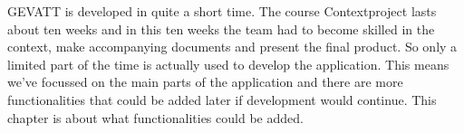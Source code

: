 GEVATT is developed in quite a short time. The course Contextproject lasts about ten weeks and in this ten weeks the team had to become skilled in the context, make accompanying documents	 and present the final product. So only a limited part of the time is actually used to develop the application. This means we've focussed on the main parts of the application and there are more functionalities that could be added later if development would continue. This chapter is about what functionalities  could be added.

